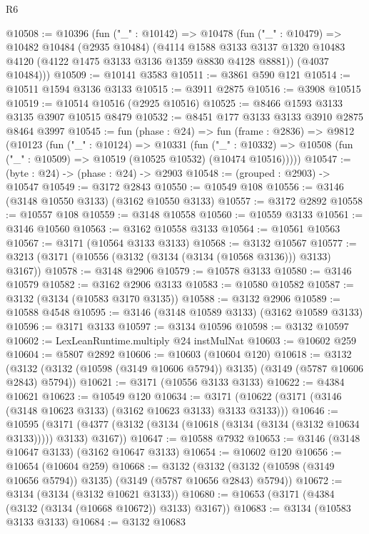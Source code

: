 \begin{lexlean}{R6}
\begin{coremodule}
@10508 := @10396
    (fun ("_" : @10142) =>
    @10478
      (fun ("_" : @10479) =>
      @10482
        @10484
        (@2935 @10484)
        (@4114
          @1588
          @3133
          @3137
          @1320
          @10483
          @4120
          (@4122 @1475 @3133 @3136 @1359 @8830 @4128 @8881))
        (@4037 @10484)))
@10509 := @10141 @3583
@10511 := @3861 @590 @121
@10514 := @10511 @1594 @3136 @3133
@10515 := @3911 @2875
@10516 := @3908 @10515
@10519 := @10514 @10516 (@2925 @10516)
@10525 := @8466 @1593 @3133 @3135 @3907 @10515 @8479
@10532 := @8451 @177 @3133 @3133 @3910 @2875 @8464 @3997
@10545 := fun (phase : @24) =>
  fun (frame : @2836) =>
  @9812
    (@10123
      (fun ("_" : @10124) =>
      @10331
        (fun ("_" : @10332) =>
        @10508 (fun ("_" : @10509) => @10519 (@10525 @10532) (@10474 @10516)))))
@10547 := (byte : @24) -> (phase : @24) -> @2903
@10548 := (grouped : @2903) -> @10547
@10549 := @3172 @2843
@10550 := @10549 @108
@10556 := @3146 (@3148 @10550 @3133) (@3162 @10550 @3133)
@10557 := @3172 @2892
@10558 := @10557 @108
@10559 := @3148 @10558
@10560 := @10559 @3133
@10561 := @3146 @10560
@10563 := @3162 @10558 @3133
@10564 := @10561 @10563
@10567 := @3171 (@10564 @3133 @3133)
@10568 := @3132 @10567
@10577 := @3213 (@3171 (@10556 (@3132 (@3134 (@3134 (@10568 @3136))) @3133) @3167))
@10578 := @3148 @2906
@10579 := @10578 @3133
@10580 := @3146 @10579
@10582 := @3162 @2906 @3133
@10583 := @10580 @10582
@10587 := @3132 (@3134 (@10583 @3170 @3135))
@10588 := @3132 @2906
@10589 := @10588 @4548
@10595 := @3146 (@3148 @10589 @3133) (@3162 @10589 @3133)
@10596 := @3171 @3133
@10597 := @3134 @10596
@10598 := @3132 @10597
@10602 := LexLeanRuntime.multiply @24 instMulNat
@10603 := @10602 @259
@10604 := @5807 @2892
@10606 := @10603 (@10604 @120)
@10618 := @3132
    (@3132 (@3132 (@10598 (@3149 @10606 @5794)) @3135) (@3149 (@5787 @10606 @2843) @5794))
@10621 := @3171 (@10556 @3133 @3133)
@10622 := @4384 @10621
@10623 := @10549 @120
@10634 := @3171 (@10622 (@3171 (@3146 (@3148 @10623 @3133) (@3162 @10623 @3133) @3133 @3133)))
@10646 := @10595
    (@3171 (@4377 (@3132 (@3134 (@10618 (@3134 (@3134 (@3132 @10634 @3133))))) @3133) @3167))
@10647 := @10588 @7932
@10653 := @3146 (@3148 @10647 @3133) (@3162 @10647 @3133)
@10654 := @10602 @120
@10656 := @10654 (@10604 @259)
@10668 := @3132
    (@3132 (@3132 (@10598 (@3149 @10656 @5794)) @3135) (@3149 (@5787 @10656 @2843) @5794))
@10672 := @3134 (@3134 (@3132 @10621 @3133))
@10680 := @10653 (@3171 (@4384 (@3132 (@3134 (@10668 @10672)) @3133) @3167))
@10683 := @3134 (@10583 @3133 @3133)
@10684 := @3132 @10683

\end{coremodule}
\end{lexlean}
